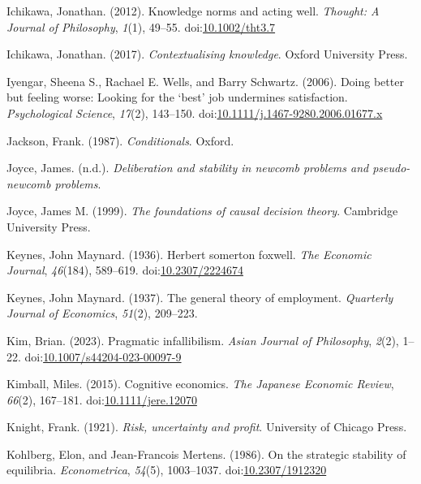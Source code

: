 \documentclass[
  10pt,
  letterpaper,
  twoside]{scrbook}
\newlength{\cslhangindent}
\newenvironment{CSLReferences}[2] %
 {\begin{list}{}{%
  \setlength{\itemindent}{0pt}
  \setlength{\leftmargin}{0pt}
  \setlength{\parsep}{0pt}
  \ifodd #1
   \setlength{\leftmargin}{\cslhangindent}
   \setlength{\itemindent}{-1\cslhangindent}
  \fi
  \setlength{\itemsep}{#2\baselineskip}}}
 {\end{list}}
\begin{document}
\begin{CSLReferences}{1}{0}
Ichikawa, Jonathan. (2012). Knowledge norms and acting well.
\emph{Thought: A Journal of Philosophy}, \emph{1}(1), 49--55.
doi:\href{https://doi.org/10.1002/tht3.7}{10.1002/tht3.7}

Ichikawa, Jonathan. (2017). \emph{Contextualising knowledge}. {O}xford
{U}niversity {P}ress.

Iyengar, Sheena S., Rachael E. Wells, and Barry Schwartz. (2006). Doing
better but feeling worse: Looking for the {`best'} job undermines
satisfaction. \emph{Psychological Science}, \emph{17}(2), 143--150.
doi:\href{https://doi.org/10.1111/j.1467-9280.2006.01677.x}{10.1111/j.1467-9280.2006.01677.x}

Jackson, Frank. (1987). \emph{Conditionals}. Oxford.

Joyce, James. (n.d.). \emph{Deliberation and stability in newcomb
problems and pseudo-newcomb problems}.

Joyce, James M. (1999). \emph{The foundations of causal decision
theory}. Cambridge University Press.

Keynes, John Maynard. (1936). Herbert somerton foxwell. \emph{The
Economic Journal}, \emph{46}(184), 589--619.
doi:\href{https://doi.org/10.2307/2224674}{10.2307/2224674}

Keynes, John Maynard. (1937). The general theory of employment.
\emph{Quarterly Journal of Economics}, \emph{51}(2), 209--223.

Kim, Brian. (2023). Pragmatic infallibilism. \emph{Asian Journal of
Philosophy}, \emph{2}(2), 1--22.
doi:\href{https://doi.org/10.1007/s44204-023-00097-9}{10.1007/s44204-023-00097-9}

Kimball, Miles. (2015). Cognitive economics. \emph{The Japanese Economic
Review}, \emph{66}(2), 167--181.
doi:\href{https://doi.org/10.1111/jere.12070}{10.1111/jere.12070}

Knight, Frank. (1921). \emph{Risk, uncertainty and profit}. University
of Chicago Press.

Kohlberg, Elon, and Jean-Francois Mertens. (1986). On the strategic
stability of equilibria. \emph{Econometrica}, \emph{54}(5), 1003--1037.
doi:\href{https://doi.org/10.2307/1912320}{10.2307/1912320}


\end{CSLReferences}
\end{document}
